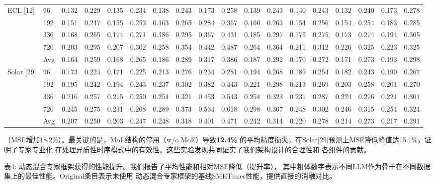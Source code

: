 \documentclass[
  10
]{article}
\begin{document}
{\begin{longtable}[]{@{}llllllllllllllllll@{}}
\multirow{5}{*}{ECL {[}12{]}} & 96 & 0.132 & 0.229 & 0.135 & 0.234 &
0.138 & 0.243 & 0.173 & 0.258 & 0.139 & 0.243 & 0.140 & 0.243 & 0.132 &
0.240 & 0.173 & 0.278 \\
& 192 & 0.151 & 0.247 & 0.155 & 0.253 & 0.163 & 0.265 & 0.284 & 0.367 &
0.160 & 0.263 & 0.154 & 0.256 & 0.154 & 0.254 & 0.183 & 0.285 \\
& 336 & 0.168 & 0.265 & 0.174 & 0.271 & 0.186 & 0.295 & 0.367 & 0.431 &
0.185 & 0.297 & 0.175 & 0.275 & 0.173 & 0.274 & 0.194 & 0.305 \\
& 720 & 0.203 & 0.295 & 0.207 & 0.302 & 0.258 & 0.354 & 0.442 & 0.487 &
0.264 & 0.364 & 0.211 & 0.312 & 0.226 & 0.325 & 0.223 & 0.325 \\
& Avg & 0.164 & 0.259 & 0.168 & 0.265 & 0.186 & 0.289 & 0.317 & 0.386 &
0.187 & 0.292 & 0.170 & 0.272 & 0.171 & 0.273 & 0.193 & 0.298 \\
\multirow{5}{*}{Solar {[}29{]}} & 96 & 0.173 & 0.224 & 0.171 & 0.225 &
0.213 & 0.276 & 0.234 & 0.281 & 0.194 & 0.268 & 0.189 & 0.254 & 0.182 &
0.243 & 0.190 & 0.267 \\
& 192 & 0.195 & 0.242 & 0.194 & 0.243 & 0.237 & 0.302 & 0.382 & 0.443 &
0.221 & 0.298 & 0.213 & 0.269 & 0.203 & 0.258 & 0.201 & 0.270 \\
& 336 & 0.216 & 0.257 & 0.215 & 0.250 & 0.254 & 0.321 & 0.453 & 0.543 &
0.254 & 0.323 & 0.231 & 0.287 & 0.224 & 0.276 & 0.221 & 0.301 \\
& 720 & 0.245 & 0.275 & 0.231 & 0.268 & 0.289 & 0.373 & 0.534 & 0.618 &
0.298 & 0.367 & 0.248 & 0.302 & 0.246 & 0.315 & 0.254 & 0.324 \\
& Avg & 0.207 & 0.250 & 0.203 & 0.247 & 0.248 & 0.318 & 0.401 & 0.471 &
0.242 & 0.314 & 0.220 & 0.278 & 0.214 & 0.273 & 0.217 & 0.291 \\
\end{longtable}
}

（MSE增加18.2\%）。最关键的是，MoE结构的停用（w/o MoE）导致\textbf{12.4\%}
的平均精度损失，在Solar{[}29{]}预测上MSE降低峰值达15.1\%，证明了专家专业化
在处理异质性时序模式中的有效性。这些实验发现共同证实了我们架构设计的合理性和
各组件的贡献。

表4: 动态混合专家框架获得的性能提升。我们报告了平均性能和相对MSE降低（提升率），
其中粗体数字表示不同LLM作为骨干在不同数据集上的最佳性能。Original条目表示未使用
动态混合专家框架的基线SMETimes性能，提供直接的消融对比。
\end{document}

